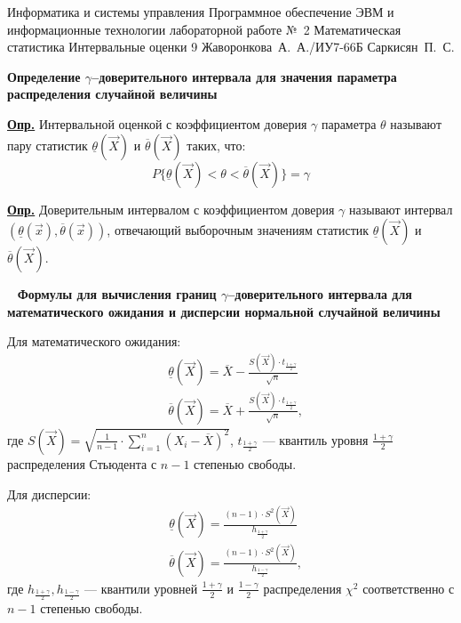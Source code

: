 \documentclass{bmstu}
\begin{document}
\makereporttitle
{Информатика и системы управления} %
{Программное обеспечение ЭВМ и информационные технологии} %
{лабораторной работе №~2} %
{Математическая статистика} %
{Интервальные оценки} %
{9} %
{Жаворонкова~А.~А./ИУ7-66Б} %
{Саркисян~П.~С.} %

\textbf{\LARGE{Определение $\gamma$--доверительного интервала для значения параметра распределения случайной величины}}
~

\underline{\textbf{Опр.}} Интервальной оценкой с коэффициентом доверия $\gamma$ параметра $\theta$ называют пару статистик $\underline{\theta}(\overrightarrow{X})$ и $\overline{\theta}(\overrightarrow{X})$ таких, что:
\begin{equation}
	P\{\underline{\theta}(\overrightarrow{X}) < \theta < \overline{\theta}(\overrightarrow{X})\} = \gamma
\end{equation}

\underline{\textbf{Опр.}} Доверительным интервалом с коэффициентом доверия $\gamma$ называют интервал $(\underline{\theta}(\overrightarrow{x}), \overline{\theta}(\overrightarrow{x}))$, отвечающий выборочным значениям статистик $\underline{\theta}(\overrightarrow{X})$ и $\overline{\theta}(\overrightarrow{X})$.

~
\textbf{\LARGE{Формулы для вычисления границ $\gamma$--доверительного интервала для математического ожидания и дисперcии нормальной случайной величины}}
~

Для математического ожидания:
\begin{equation}
	\begin{aligned}
		&\underline{\theta}(\overrightarrow{X}) = \overline{X} - \frac{S(\overrightarrow{X}) \cdot t_{\frac{1 + \gamma}{2}}}{\sqrt{n}} \\
		&\overline{\theta}(\overrightarrow{X}) =\overline{X} + \frac{S(\overrightarrow{X}) \cdot t_{\frac{1 + \gamma}{2}}}{\sqrt{n}},
	\end{aligned}
\end{equation} где $S(\overrightarrow{X}) = \sqrt{\frac{1}{n - 1} \cdot \sum_{i=1}^{n}(X_i - \overline{X})^2}$, $t_{\frac{1 + \gamma}{2}}$ --- квантиль уровня $\frac{1 + \gamma}{2}$ распределения Стьюдента с $n - 1$ степенью свободы.

Для дисперсии:
\begin{equation}
	\begin{aligned}
		&\underline{\theta}(\overrightarrow{X}) = \frac{(n - 1) \cdot S^2(\overrightarrow{X})}{h_{\frac{1 + \gamma}{2}}} \\
		&\overline{\theta}(\overrightarrow{X}) = \frac{(n - 1) \cdot S^2(\overrightarrow{X})}{h_{\frac{1 - \gamma}{2}}},
	\end{aligned}
\end{equation} где $h_{\frac{1 + \gamma}{2}}, h_{\frac{1 - \gamma}{2}}$ --- квантили уровней $\frac{1 + \gamma}{2}$ и $\frac{1 - \gamma}{2}$ распределения $\chi^2$ соответственно с $n - 1$ степенью свободы.
\end{document}
